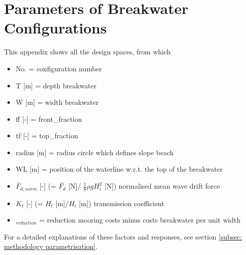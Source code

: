 \chapter{Parameters of Breakwater Configurations }
\label{app: parameters configurationss}

This appendix shows all the design spaces, from which
\begin{itemize}
    \item No. = configuration number
    \item T [m] = depth breakwater
    \item W [m] = width breakwater
    \item ff [-] = front\_fraction
    \item tf [-] = top\_fraction
    \item radius [m] = radius circle which defines slope beach
    \item WL [m] = position of the waterline w.r.t. the top of the breakwater
    \item $\bar{F}_{d,norm}$ [-] (= $\bar{F_d}$ [N]/ $\frac{1}{8}\rho g H_i^2$ [N]) normalised mean wave drift force
    \item $K_t$ [-] (= $H_t$ [m]/$H_i$ [m]) transmission coefficient
    \item \texteuro$_{reduction}$ = reduction mooring costs minus costs breakwater per unit width 
\end{itemize}

For a detailed explanations of these factors and responses, see section \ref{subsec: methodology parametrisation}.



